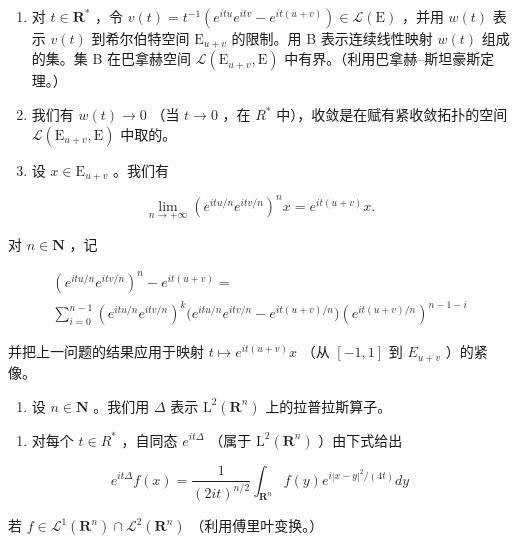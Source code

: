 \begin{enumerate}
\def\labelenumi{\alph{enumi})}
\item
  对 \(t \in \mathbf{R}^*\) ，令 \(v(t) = t^{-1}(e^{itu}e^{itv} - e^{it(u + v)}) \in \mathcal{L}(\mathrm{E})\) ，并用 \(w(t)\) 表示 \(v(t)\) 到希尔伯特空间 \(\mathrm{E}_{u + v}\) 的限制。用 B 表示连续线性映射 \(w(t)\) 组成的集。集 B 在巴拿赫空间 \(\mathcal{L}(\mathrm{E}_{u + v},\mathrm{E})\) 中有界。（利用巴拿赫–斯坦豪斯定理。）
\item
  我们有 \(w(t) \to 0\) （当 \(t \to 0\) ，在 \(R^{*}\) 中），收敛是在赋有紧收敛拓扑的空间 \(\mathcal{L}(\mathrm{E}_{u+v},\mathrm{E})\) 中取的。
\item
  设 \(x\in \mathrm{E}_{u + v}\) 。我们有
\end{enumerate}

\[
\lim _ {n \to + \infty} (e ^ {i t u / n} e ^ {i t v / n}) ^ {n} x = e ^ {i t (u + v)} x.
\]

对 \(n\in \mathbf{N}\) ，记

\[
\begin{array}{l} (e ^ {i t u / n} e ^ {i t v / n}) ^ {n} - e ^ {i t (u + v)} = \\ \sum_ {i = 0} ^ {n - 1} (e ^ {i t u / n} e ^ {i t v / n}) ^ {k} \Big (e ^ {i t u / n} e ^ {i t v / n} - e ^ {i t (u + v) / n} \Big) (e ^ {i t (u + v) / n}) ^ {n - 1 - i} \end{array}
\]

并把上一问题的结果应用于映射 \(t \mapsto e^{it(u+v)}x\) （从 \([-1,1]\) 到 \(E_{u+v}\) ）的紧像。

\begin{enumerate}
\def\labelenumi{\arabic{enumi})}
\setcounter{enumi}{32}
\tightlist
\item
  设 \(n \in \mathbf{N}\) 。我们用 \(\Delta\) 表示 \(\mathrm{L}^2(\mathbf{R}^n)\) 上的拉普拉斯算子。
\end{enumerate}

\begin{enumerate}
\def\labelenumi{\alph{enumi})}
\tightlist
\item
  对每个 \(t \in R^{*}\) ，自同态 \(e^{it\Delta}\) （属于 \(\mathrm{L}^{2}(\mathbf{R}^{n})\) ）由下式给出
\end{enumerate}

\[
e ^ {i t \Delta} f (x) = \frac {1}{(2 i t) ^ {n / 2}} \int_ {\mathbf {R} ^ {n}} f (y) e ^ {i | x - y | ^ {2} / (4 t)} d y
\]

若 \(f\in \mathcal{L}^1 (\mathbf{R}^n)\cap \mathcal{L}^2 (\mathbf{R}^n)\) （利用傅里叶变换。）

